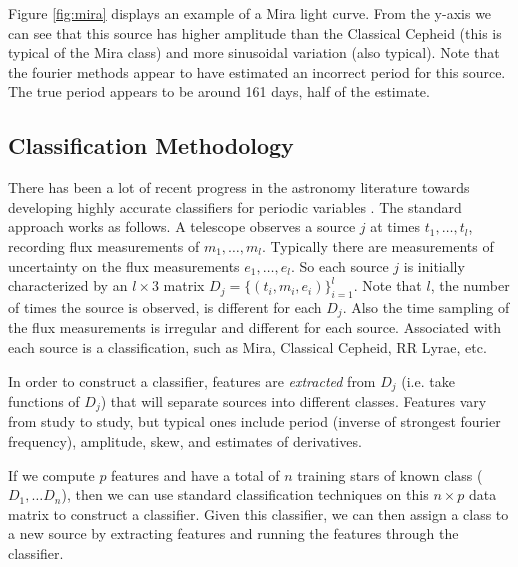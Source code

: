 \documentclass[10pt]{article}
\theoremstyle{definition}
\begin{document}
Figure \ref{fig:mira} displays an example of a Mira light curve. From the y-axis we can see that this source has higher amplitude than the Classical Cepheid (this is typical of the Mira class) and more sinusoidal variation (also typical). Note that the fourier methods appear to have estimated an incorrect period for this source. The true period appears to be around 161 days, half of the estimate.
\subsection{Classification Methodology}
There has been a lot of recent progress in the astronomy literature towards developing highly accurate classifiers for periodic variables \cite{debosscher2007automated,richards2011machine,dubath2011random}. The standard approach works as follows. A telescope observes a source $j$ at times $t_{1},\ldots,t_{l}$, recording flux measurements of $m_{1},\ldots,m_{l}$. Typically there are measurements of uncertainty on the flux measurements $e_{1},\ldots,e_{l}$. So each source $j$ is initially characterized by an $l \times 3$ matrix $D_j=\{(t_{i},m_{i},e_{i})\}_{i=1}^{l}$. Note that $l$, the number of times the source is observed, is different for each $D_j$. Also the time sampling of the flux measurements is irregular and different for each source. Associated with each source is a classification, such as Mira, Classical Cepheid, RR Lyrae, etc.

In order to construct a classifier, features are \textit{extracted} from $D_j$ (i.e. take functions of $D_j$) that will separate sources into different classes. Features vary from study to study, but typical ones include period (inverse of strongest fourier frequency), amplitude, skew, and estimates of derivatives.

If we compute $p$ features and have a total of $n$ training stars of known class ($D_1, \ldots D_n$), then we can use standard classification techniques on this $n\times p$ data matrix to construct a classifier. Given this classifier, we can then assign a class to a new source by extracting features and running the features through the classifier.
\end{document}
